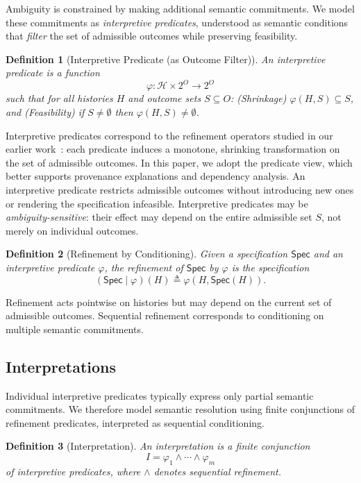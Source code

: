 \documentclass[acmsmall,nonacm]{acmart}
\newtheorem{definition}{Definition}
\theoremstyle{remark}
\numberwithin{definition}{section}
\numberwithin{theorem}{section}
\numberwithin{lemma}{section}
\numberwithin{corollary}{section}
\numberwithin{remark}{section}
\numberwithin{example}{section}
\numberwithin{observation}{section}
\numberwithin{assumption}{section}
\newcommand{\Hist}{\mathcal{H}}
\newcommand{\Spec}{\mathsf{Spec}}
\begin{document}
Ambiguity is constrained by making additional semantic commitments.
We model these commitments as \emph{interpretive predicates}, understood as
semantic conditions that \emph{filter} the set of admissible outcomes while
preserving feasibility.

\begin{definition}[Interpretive Predicate (as Outcome Filter)]
An \emph{interpretive predicate} is a function
\[
  \varphi : \Hist \times 2^{O} \to 2^{O}
\]
such that for all histories $H$ and outcome sets $S \subseteq O$:
(\emph{Shrinkage}) $\varphi(H,S) \subseteq S$, and (\emph{Feasibility}) if $S \neq \emptyset$ then $\varphi(H,S) \neq \emptyset$.
\end{definition}

Interpretive predicates correspond to the refinement operators studied in our
earlier work~\cite{hellerstein2026interpretation}: each predicate induces a
monotone, shrinking transformation on the set of admissible outcomes.
In this paper, we adopt the predicate view, which better supports provenance
explanations and dependency analysis.
An interpretive predicate restricts admissible outcomes without introducing new ones
or rendering the specification infeasible.
Interpretive predicates may be \emph{ambiguity-sensitive}: their effect may depend on the entire
admissible set $S$, not merely on individual outcomes.

\begin{definition}[Refinement by Conditioning]
Given a specification $\Spec$ and an interpretive predicate $\varphi$, the
\emph{refinement} of $\Spec$ by $\varphi$ is the specification
\[
  (\Spec \mid \varphi)(H) \triangleq \varphi(H,\Spec(H)).
\]
\end{definition}

Refinement acts pointwise on histories but may depend on the current set of
admissible outcomes.
Sequential refinement corresponds to conditioning on multiple semantic
commitments.

\subsection{Interpretations}

Individual interpretive predicates typically express only partial semantic
commitments.
We therefore model semantic resolution using finite conjunctions of refinement
predicates, interpreted as sequential conditioning.

\begin{definition}[Interpretation]
An \emph{interpretation} is a finite conjunction
\[
  I = \varphi_1 \wedge \cdots \wedge \varphi_m
\]
of interpretive predicates, where $\wedge$ denotes sequential refinement.
\end{definition}
\end{document}
